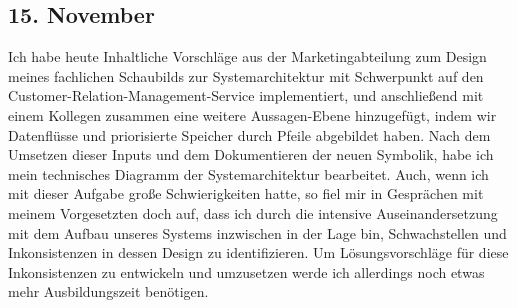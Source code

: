 \subsection{15. November}
Ich habe heute Inhaltliche Vorschläge aus der Marketingabteilung zum Design meines fachlichen Schaubilds zur Systemarchitektur mit Schwerpunkt auf den Customer-Relation-Management-Service implementiert, und anschließend mit einem Kollegen zusammen eine weitere Aussagen-Ebene hinzugefügt, indem wir Datenflüsse und priorisierte Speicher durch Pfeile abgebildet haben. Nach dem Umsetzen dieser Inputs und dem Dokumentieren der neuen Symbolik, habe ich mein technisches Diagramm der Systemarchitektur bearbeitet. Auch, wenn ich mit dieser Aufgabe große Schwierigkeiten hatte, so fiel mir in Gesprächen mit meinem Vorgesetzten doch auf, dass ich durch die intensive Auseinandersetzung mit dem Aufbau unseres Systems inzwischen in der Lage bin, Schwachstellen und Inkonsistenzen in dessen Design zu identifizieren. Um Lösungsvorschläge für diese Inkonsistenzen zu entwickeln und umzusetzen werde ich allerdings noch etwas mehr Ausbildungszeit benötigen.
